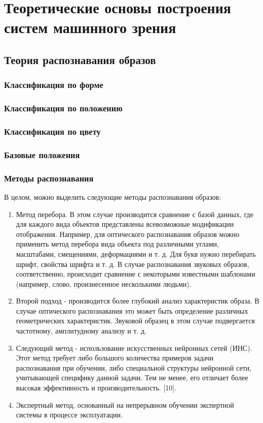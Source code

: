 \chapter{Теоретические основы построения систем машинного зрения} \label{chapt3}

\section{Теория распознавания образов} \label{sect3_1}

\subsection{Классификация по форме}

\subsection{Классификация по положению}

\subsection{Классификация по цвету}

\subsection{Базовые положения}

\subsection{Методы распознавания}

В целом, можно выделить следующие методы распознавания образов:

\begin{enumerate}
	\item Метод перебора. В этом случае производится сравнение с базой данных, где для каждого вида объектов представлены всевозможные модификации отображения. Например, для оптического распознавания образов можно применить метод перебора вида объекта под различными углами, масштабами, смещениями, деформациями и т. д. Для букв нужно перебирать шрифт, свойства шрифта и т. д. В случае распознавания звуковых образов, соответственно, происходит сравнение с некоторыми известными шаблонами (например, слово, произнесенное несколькими людьми).
	\item Второй подход - производится более глубокий анализ характеристик образа. В случае оптического распознавания это может быть определение различных геометрических характеристик. Звуковой образец в этом случае подвергается частотному, амплитудному анализу и т. д.
	\item Следующий метод - использование искусственных нейронных сетей (ИНС). Этот метод требует либо большого количества примеров задачи распознавания при обучении, либо специальной структуры нейронной сети, учитывающей специфику данной задачи. Тем не менее, его отличает более высокая эффективность и производительность. [10].
	\item Экспертный метод, основанный на непрерывном обучении экспертной системы в процессе эксплуатации.
\end{enumerate}

